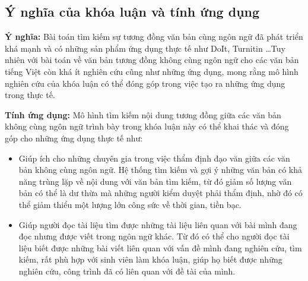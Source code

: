 \documentclass[12pt]{report}
\begin{document}
\subsection{Ý nghĩa của khóa luận và tính ứng dụng}

\textbf{Ý nghĩa:}
Bài toán tìm kiếm sự tương đồng văn bản cùng ngôn ngữ đã phát triển khá mạnh và có những sản phẩm ứng dụng thực tế như DoIt, Turnitin \dots Tuy nhiên với bài toán về văn bản tương đồng không cùng ngôn ngữ cho các văn bản tiếng Việt còn khá ít nghiên cứu cũng như những ứng dụng, mong rằng mô hình nghiên cứu của khóa luận có thể đóng góp trong việc tạo ra những ứng dụng trong thực tế. 

\noindent\textbf{Tính ứng dụng:}
Mô hình tìm kiếm nội dung tương đồng giữa các văn bản không cùng ngôn ngữ trình bày trong khóa luận này có thể khai thác và đóng góp cho những ứng dụng thực tế như:
\begin{itemize}

	\item Giúp ích cho những chuyên gia trong việc thẩm định đạo văn giữa các văn bản không cùng ngôn ngữ. Hệ thống tìm kiếm và gợi ý những văn bản có khả năng trùng lặp về nội dung với văn bản tìm kiếm, từ đó giảm số lượng văn bản có thể là dư thừa mà những người kiểm duyệt phải thẩm định, nhờ đó có thể giảm thiểu một lượng lớn công sức về thời gian, tiền bạc.
	
	\item Giúp người đọc tài liệu tìm được những tài liệu liên quan với bài mình đang đọc nhưng được viết trong ngôn ngữ khác. Từ đó có thể cho người đọc tài liệu biết được những bài viết liên quan với vấn đề mình đang nghiên cứu, tìm kiếm, rất phù hợp với sinh viên làm khóa luận, giúp họ biết được những nghiên cứu, công trình đã có liên quan với đề tài của mình.
\end{itemize}
\end{document}
